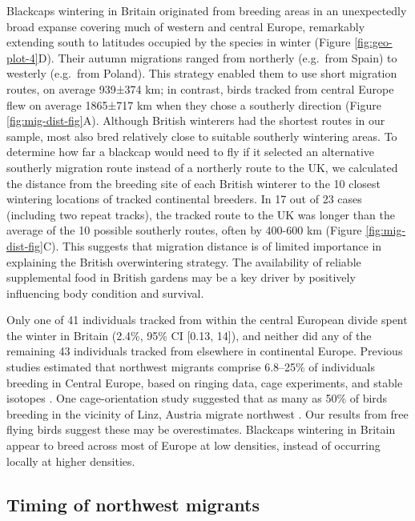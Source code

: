 \documentclass[a4paper, nobind]{templates/ociamthesis}
\begin{document}
Blackcaps wintering in Britain originated from breeding areas in an unexpectedly broad expanse covering much of western and central Europe, remarkably extending south to latitudes occupied by the species in winter (Figure \ref{fig:geo-plot-4}D). Their autumn migrations ranged from northerly (e.g.~from Spain) to westerly (e.g.~from Poland).
This strategy enabled them to use short migration routes, on average 939±374 km; in contrast, birds tracked from central Europe flew on average 1865±717 km when they chose a southerly direction (Figure \ref{fig:mig-dist-fig}A).
Although British winterers had the shortest routes in our sample, most also bred relatively close to suitable southerly wintering areas.
To determine how far a blackcap would need to fly if it selected an alternative southerly migration route instead of a northerly route to the UK, we calculated the distance from the breeding site of each British winterer to the 10 closest wintering locations of tracked continental breeders.
In 17 out of 23 cases (including two repeat tracks), the tracked route to the UK was longer than the average of the 10 possible southerly routes, often by 400-600 km (Figure \ref{fig:mig-dist-fig}C).
This suggests that migration distance is of limited importance in explaining the British overwintering strategy. The availability of reliable supplemental food in British gardens may be a key driver \autocite{plummerSupplementaryFeedingGardens2015} by positively influencing body condition and survival.

Only one of 41 individuals tracked from within the central European divide spent the winter in Britain (2.4\%, 95\% CI {[}0.13, 14{]}), and neither did any of the remaining 43 individuals tracked from elsewhere in continental Europe.
Previous studies estimated that northwest migrants comprise 6.8--25\% of individuals breeding in Central Europe, based on ringing data, cage experiments, and stable isotopes \autocite{helbigPopulationDifferentiationMigratory1992,helbigSESWmigratingBlackcap1991,rolshausenContemporaryEvolutionReproductive2009,rolshausenSpringArrivalMigratory2010}.
One cage-orientation study suggested that as many as 50\% of birds breeding in the vicinity of Linz, Austria migrate northwest \autocite{helbigSESWmigratingBlackcap1991}.
Our results from free flying birds suggest these may be overestimates. Blackcaps wintering in Britain appear to breed across most of Europe at low densities, instead of occurring locally at higher densities.

\hypertarget{timing-of-northwest-migrants}{%
\subsection{Timing of northwest migrants}\label{timing-of-northwest-migrants}}
\end{document}
